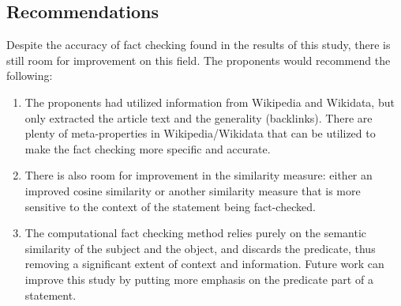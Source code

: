 \documentclass[10pt,11pt,12pt,oneside]{book}
\begin{document}
\subsection{Recommendations}

Despite the accuracy of fact checking found in the results of this study, there is still room for improvement on this field. The proponents would recommend the following:

\begin{enumerate}
	\item The proponents had utilized information from Wikipedia and Wikidata, but only extracted the article text and the generality (backlinks). There are plenty of meta-properties in Wikipedia/Wikidata that can be utilized to make the fact checking more specific and accurate.
	\item There is also room for improvement in the similarity measure: either an improved cosine similarity or another similarity measure that is more sensitive to the context of the statement being fact-checked.
	\item The computational fact checking method relies purely on the semantic similarity of the subject and the object, and discards the predicate, thus removing a significant extent of context and information. Future work can improve this study by putting more emphasis on the predicate part of a statement.
\end{enumerate}





\end{document}

